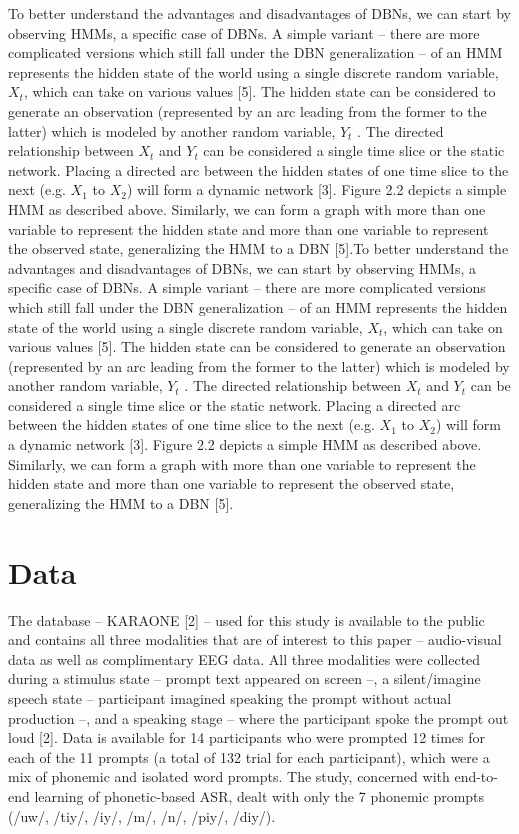 \documentclass[11pt,letterpaper]{article}
\begin{document}
To better understand the advantages and disadvantages of DBNs, we can start by observing HMMs, a specific case of DBNs. A simple variant – there are more complicated versions which still fall under the DBN generalization – of an HMM represents the hidden state of the world using a single discrete random variable, $X_t$, which can take on various values [5]. The hidden state can be considered to generate an observation (represented by an arc leading from the former to the latter) which is modeled by another random variable, $Y_t$ . The directed relationship between $X_t$ and $Y_t$ can be considered a single time slice or the static network. Placing a directed arc between the hidden states of one time slice to the next (e.g. $X_1$ to $X_2$) will form a dynamic network [3]. Figure 2.2 depicts a simple HMM as described above. Similarly, we can form a graph with more than one variable to represent the hidden state and more than one variable to represent the observed state, generalizing the HMM to a DBN [5].To better understand the advantages and disadvantages of DBNs, we can start by observing HMMs, a specific case of DBNs. A simple variant – there are more complicated versions which still fall under the DBN generalization – of an HMM represents the hidden state of the world using a single discrete random variable, $X_t$, which can take on various values [5]. The hidden state can be considered to generate an observation (represented by an arc leading from the former to the latter) which is modeled by another random variable, $Y_t$ . The directed relationship between $X_t$ and $Y_t$ can be considered a single time slice or the static network. Placing a directed arc between the hidden states of one time slice to the next (e.g. $X_1$ to $X_2$) will form a dynamic network [3]. Figure 2.2 depicts a simple HMM as described above. Similarly, we can form a graph with more than one variable to represent the hidden state and more than one variable to represent the observed state, generalizing the HMM to a DBN [5].

\section{Data}

The database – KARAONE [2] – used for this study is available to the public and contains all three modalities that are of interest to this paper – audio-visual data as well as complimentary EEG data. All three modalities were collected during a stimulus state – prompt text appeared on screen –, a silent/imagine speech state – participant imagined speaking the prompt without actual production –, and a speaking stage – where the participant spoke the prompt out loud [2]. Data is available for 14 participants who were prompted 12 times for each of the 11 prompts (a total of 132 trial for each participant), which were a mix of phonemic and isolated word prompts. The study, concerned with end-to-end learning of phonetic-based ASR, dealt with only the 7 phonemic prompts (/uw/, /tiy/, /iy/, /m/, /n/, /piy/, /diy/). 
\end{document}

